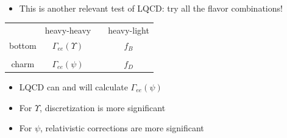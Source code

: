 \documentclass[landscape]{article}
\newenvironment{slide}[1][ ]{\mbox{\bf \boldmath #1 } \vfill}{\vfill \vspace{-1.5 cm} \mbox{ } \pagebreak}
\newenvironment{itemizer}[1]{\begin{itemize}\setlength{\itemsep}{#1}}{\end{itemize}}
\begin{document}
\begin{slide}

\begin{itemize}

  \item This is another relevant test of LQCD: try all the flavor combinations!

\end{itemize}

\vfill

\begin{center}
  \renewcommand{\arraystretch}{2}
  \begin{tabular}{c c c c}
    & heavy-heavy & \mbox{\hspace{1 cm}} & heavy-light \\
    bottom \mbox{\hspace{1 cm}} & $\Gamma_{ee}(\Upsilon)$ & & $f_B$ \\
    & & & \\
    charm \mbox{\hspace{1 cm}} & $\Gamma_{ee}(\psi)$ & & $f_D$ \\
  \end{tabular}
\end{center}

\vfill
\begin{itemizer}{1 cm}

  \item LQCD can and will calculate $\Gamma_{ee}(\psi)$

  \item For $\Upsilon$, discretization is more significant

  \item For $\psi$, relativistic corrections are more significant

\end{itemizer}

\vspace{1 cm}

\end{slide}
\end{document}
